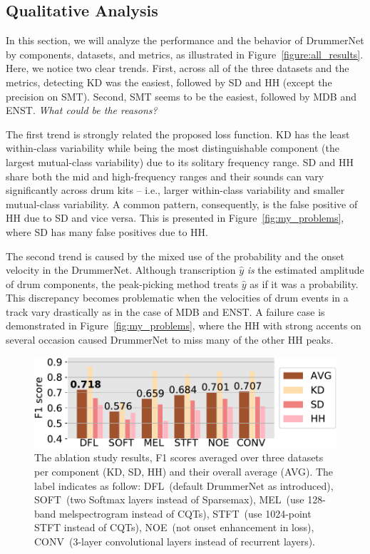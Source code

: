 \documentclass{article}
\newcommand{\largesqueeze}{\vspace{-0.2cm}}
\begin{document}
	\largesqueeze
	\subsection{Qualitative Analysis} 
	\label{subsec:qual_a}
	
	In this section, we will analyze the performance and the behavior of DrummerNet by components, datasets, and metrics, as illustrated in Figure~\ref{figure:all_results}.
	Here, we notice two clear trends. First, across all of the three datasets and the metrics, detecting KD was the easiest, followed by SD and HH (except the precision on SMT). Second, SMT seems to be the easiest, followed by MDB and ENST. \textit{What could be the reasons?}
	
	The first trend is strongly related the proposed loss function. KD has the least within-class variability while being the most distinguishable component (the largest mutual-class variability) due to its solitary frequency range. SD and HH share both the mid and high-frequency ranges and their sounds can vary significantly across drum kits -- i.e., larger within-class variability and smaller mutual-class variability. A common pattern, consequently, is the false positive of HH due to SD and vice versa. This is presented in Figure~\ref{fig:my_problems}, where SD has many false positives due to HH.
	
	The second trend is caused by the mixed use of the probability and the onset velocity in the DrummerNet. Although transcription $\hat{y}$ \textit{is} the estimated amplitude of drum components, the peak-picking method treats $\hat{y}$ as if it was a probability. This discrepancy becomes problematic when the velocities of drum events in a track vary drastically as in the case of MDB and ENST. A failure case is demonstrated in Figure~\ref{fig:my_problems}, where the HH with strong accents on several occasion caused DrummerNet to miss many of the other HH peaks.
	
	\begin{figure}[t]
		\centering
		\includegraphics[width=0.94\columnwidth]{results_all_averages_split.pdf}
		\caption{The ablation study results, F1 scores averaged over three datasets per component (KD, SD, HH) and their overall average (AVG). The label indicates as follow: DFL~(default DrummerNet as introduced), SOFT~(two Softmax layers instead of Sparsemax), MEL~(use 128-band melspectrogram instead of CQTs), STFT~(use 1024-point STFT instead of CQTs), NOE~(not onset enhancement in loss), CONV~(3-layer convolutional layers instead of recurrent layers).}
		\label{fig:ablation}
	\end{figure}
	
\end{document}
